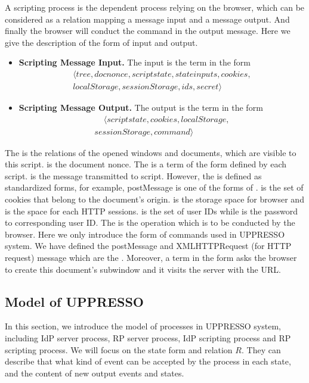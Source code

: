 \begin{appendices}
A scripting process is the dependent process relying on the browser, which can be considered as a relation  mapping a message input and a message output. And finally the browser will conduct the command in the output message. Here we give the description of the form of input and output.
\begin{itemize}
\item \textbf{Scripting Message Input. } The input is the term in the form
\begin{multline*}
\langle tree, docnonce, scriptstate, stateinputs,cookies,\\
localStorage, sessionStorage, ids, secret \rangle
\end{multline*}
\item \textbf{Scripting Message Output. }The output is the term in the form
\begin{multline*}
\ \ \ \ \ \langle scriptstate, cookies, localStorage, \\
sessionStorage, command \rangle \ \ \ \ \ 
\end{multline*}
\end{itemize}
The  is the relations of the opened windows and documents, which are visible to this script.  is the document nonce. The   is a term of the form defined by each script.  is the message transmitted to script. However, the  is defined as standardized forms, for example, postMessage is one of the forms of .  is the set of cookies that belong to the document's origin.  is the storage space for browser and  is the space for each HTTP sessions.   is the set of user IDs while  is the password to corresponding user ID. The  is the operation which is to be conducted by the browser. Here we only introduce the form of commands used in UPPRESSO system. We have defined the postMessage and XMLHTTPRequest (for HTTP request) message which are the . Moreover, a term in the form  asks the browser to create this document's subwindow and it visits the server with the URL.



\subsection{Model of UPPRESSO}
In this section, we introduce the model of processes in UPPRESSO system, including IdP server process, RP server process, IdP scripting process and RP scripting process. We will focus on the state form and relation $R$. They can describe that what kind of event can be accepted by the process in each state, and the content of new output events and states.

\end{appendices}
